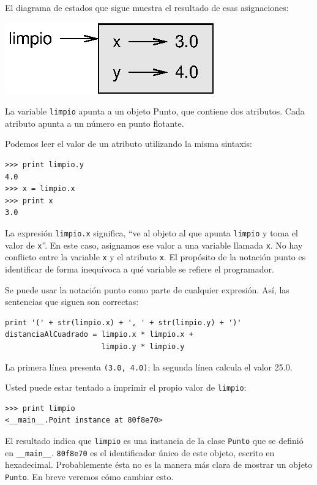 El diagrama de estados que sigue muestra el resultado de esas asignaciones:

\beforefig
\centerline{\includegraphics{illustrations/point.eps}}
\afterfig

La variable \texttt{limpio} apunta a un objeto Punto, que
contiene dos atributos. Cada atributo apunta a un número
en punto flotante.

Podemos leer el valor de un atributo utilizando la misma sintaxis:

\beforeverb
\begin{verbatim}
>>> print limpio.y
4.0
>>> x = limpio.x
>>> print x
3.0
\end{verbatim}
\afterverb
%
La expresión \texttt{limpio.x} significa, ``ve al objeto al que apunta \texttt{limpio}
y toma el valor de \texttt{x}''. En este caso, asignamos ese valor a una variable
llamada \texttt{x}. No hay conflicto entre la variable \texttt{x} y el atributo \texttt{x}.
El propósito de la notación punto es identificar de forma inequívoca a qué
variable se refiere el programador.

Se puede usar la notación punto como parte de cualquier expresión. Así, las
sentencias que siguen son correctas:

\beforeverb
\begin{verbatim}
print '(' + str(limpio.x) + ', ' + str(limpio.y) + ')'
distanciaAlCuadrado = limpio.x * limpio.x + 
                      limpio.y * limpio.y
\end{verbatim}
\afterverb
%
La primera línea presenta \texttt{(3.0, 4.0)}; la segunda línea calcula el valor 25.0.

Usted puede estar tentado a imprimir el propio valor de \texttt{limpio}:

\beforeverb
\begin{verbatim}
>>> print limpio
<__main__.Point instance at 80f8e70>
\end{verbatim}
\afterverb
%
El resultado indica que \texttt{limpio} es una instancia de la clase
\texttt{Punto} que se definió en \texttt{\_\_main\_\_}.  \texttt{80f8e70} es
el identificador único de este objeto, escrito en hexadecimal.
Probablemente ésta no es la manera más clara de mostrar un objeto
\texttt{Punto}. En breve veremos cómo cambiar esto.

